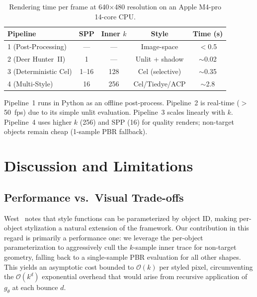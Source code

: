 \documentclass{article}
\begin{document}
\begin{table}[h]
    \caption{Rendering time per frame at 640$\times$480 resolution on an Apple M4-pro 14-core CPU.}
    \label{tab:performance}
    \centering
    \begin{tabular}{lcccc}
        \toprule
        Pipeline & SPP & Inner $k$ & Style & Time (s) \\
        \midrule
        1 (Post-Processing) & --- & --- & Image-space & $<$0.5 \\
        2 (Deer Hunter~II) & 1 & --- & Unlit + shadow & $\sim$0.02 \\
        3 (Deterministic Cel) & 1--16 & 128 & Cel (selective) & $\sim$0.35 \\
        4 (Multi-Style) & 16 & 256 & Cel/Tiedye/ACP & $\sim$2.8 \\
        \bottomrule
    \end{tabular}
\end{table}

Pipeline~1 runs in Python as an offline post-process. Pipeline~2 is real-time ($>$50~fps) due to its simple unlit evaluation. Pipeline~3 scales linearly with $k$. Pipeline~4 uses higher $k$ (256) and SPP (16) for quality renders; non-target objects remain cheap (1-sample PBR fallback).


\section{Discussion and Limitations}
\label{sec:discussion}

\subsection{Performance vs.~Visual Trade-offs}

West~\cite{west2024stylized} notes that style functions can be parameterized by object ID, making per-object stylization a natural extension of the framework.
Our contribution in this regard is primarily a performance one: we leverage the per-object parameterization to aggressively cull the $k$-sample inner trace for non-target geometry, falling back to a single-sample PBR evaluation for all other shapes.
This yields an asymptotic cost bounded to $\mathcal{O}(k)$ per styled pixel, circumventing the $\mathcal{O}(k^d)$ exponential overhead that would arise from recursive application of $g_\theta$ at each bounce $d$.
\end{document}
